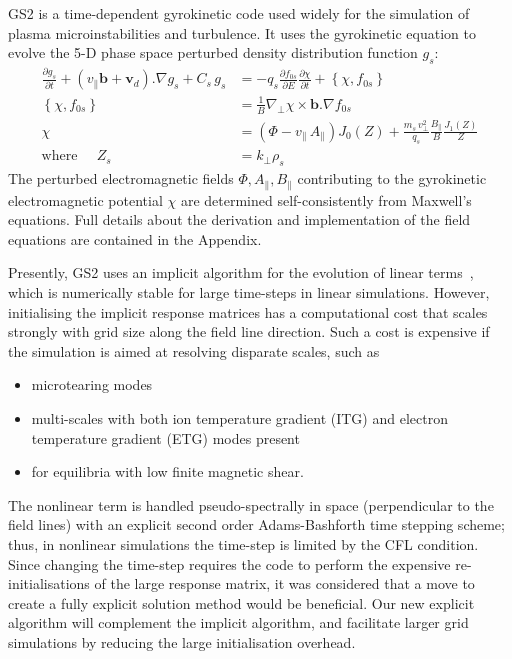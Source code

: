 \documentclass[10pt,a4paper]{article}
\begin{document}
GS2 is a time-dependent gyrokinetic code used widely for the simulation of
plasma microinstabilities and turbulence. It uses the gyrokinetic equation to
evolve the 5-D phase space perturbed density distribution function $g_s$:
\begin{align}
\frac{\partial g_s}{\partial t} + (v_\parallel \mathbf{b} +
\mathbf{v}_d).\nabla g_s + C_s \, g_s & = -q_s \frac{\partial f_{0s}}{\partial E}
\frac{\partial \chi}{\partial t} + \left\{ \chi, f_{0s} \right\} \\
\left\{ \chi, f_{0s} \right\} & = \frac{1}{B} \nabla_{\perp} \chi \times
\mathbf{b}.\nabla f_{0s} \nonumber \\
\chi & = (\Phi - v_\parallel \, A_\parallel) J_0(Z) + \frac{m_s \,
v_\perp^2}{q_s} \frac{B_\parallel}{B} \frac{J_1(Z)}{Z} \nonumber \\
\mbox{where} \;\;\;\;\;
Z_s & = k_\perp \rho_s \nonumber
\end{align}
The perturbed electromagnetic fields $\Phi, A_\parallel, B_\parallel$
contributing to the gyrokinetic electromagnetic potential $\chi$ are
determined self-consistently from Maxwell's equations. Full details about the
derivation and implementation of the field equations are contained in the
Appendix.

Presently, GS2 uses an implicit algorithm for the evolution of linear
terms~\cite{kotschenreuther}, which is numerically stable for large time-steps
in linear simulations. However, initialising the implicit response matrices
has a computational cost that scales strongly with grid size along the field
line direction. Such a cost is expensive if the simulation is aimed at
resolving disparate scales, such as
\begin{itemize}
\item microtearing modes
\item multi-scales with both ion temperature gradient (ITG) and electron
  temperature gradient (ETG) modes present
\item for equilibria with low finite magnetic shear.
\end{itemize}
The nonlinear term is handled pseudo-spectrally in space (perpendicular to the
field lines) with an explicit second order Adams-Bashforth time stepping
scheme; thus, in nonlinear simulations the time-step is limited by the CFL
condition. Since changing the time-step requires the code to perform the
expensive re-initialisations of the large response matrix, it was considered
that a move to create a fully explicit solution method would be beneficial.
Our new explicit algorithm will complement the implicit algorithm, and
facilitate larger grid simulations by reducing the large initialisation
overhead.
\end{document}
